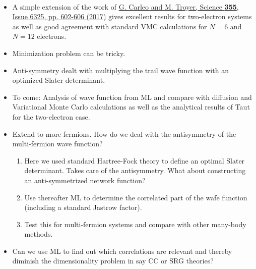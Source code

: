 \documentclass[%
oneside,                 %
final,                   %
10pt]{article}
\begin{document}
\paragraph{}
\begin{itemize}
\item A simple extension of the work of \href{{http://science.sciencemag.org/content/355/6325/602}}{G. Carleo and M. Troyer, Science \textbf{355}, Issue 6325, pp. 602-606 (2017)} gives excellent results for two-electron systems as well as good agreement with standard VMC calculations for $N=6$ and $N=12$ electrons.

\item Minimization problem can be tricky.

\item Anti-symmetry dealt with multiplying the trail wave function with an optimized Slater determinant.

\item To come: Analysis of wave function from ML and compare with diffusion and Variational Monte Carlo calculations as well as the analytical results of Taut for the two-electron case.

\item Extend to more fermions. How do we deal with the antisymmetry of the multi-fermion wave function?
\begin{enumerate}

 \item Here we used standard Hartree-Fock theory to define an optimal Slater determinant. Takes care of the antisymmetry. What about constructing an anti-symmetrized network function?

 \item Use thereafter ML to determine the correlated part of the wafe function (including a standard Jastrow factor).

 \item Test this for multi-fermion systems and compare with other many-body methods.

\end{enumerate}

\noindent
\item Can we use ML to find out which correlations are relevant and thereby diminish the dimensionality problem in say CC or SRG theories?
\end{itemize}

\noindent






\end{document}
